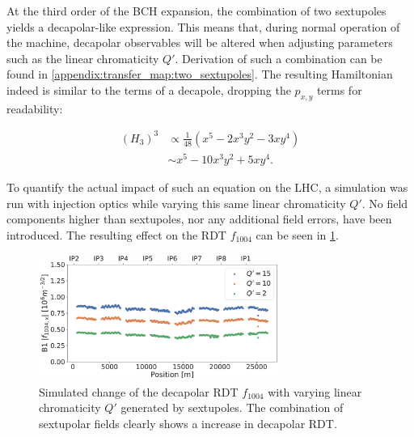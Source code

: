\subsubsection{}

At the third order of the BCH expansion, the combination of two sextupoles yields a decapolar-like
expression. This means that, during normal operation of the machine, decapolar observables will be
altered when adjusting parameters such as the linear chromaticity $Q'$. 
Derivation of such a combination can be found in \cref{appendix:transfer_map:two_sextupoles}. The
resulting Hamiltonian indeed is similar to the terms of a decapole, dropping the $p_{x,y}$ terms for
readability:

\begin{equation}
    \begin{aligned}
         (H_3)^3 &\propto \frac{1}{48} \left(x^5 - 2x^3y^2 - 3xy^4 \right)\\
                 &\sim    x^5 - 10x^3y^2 + 5xy^4.
    \end{aligned}
    \label{eq:decapoles:sextupoles_b5}
\end{equation}

To quantify the actual impact of such an equation on the LHC, a simulation was run with injection
optics while varying this same linear chromaticity $Q'$. No field components higher than
sextupoles, nor any additional field errors, have been introduced. The resulting effect on the RDT
$f_{1004}$ can be seen in \cref{fig:decapoles:rdts:simulated_f1004_from_sextupoles}.


\begin{figure}[H]
    \centering
    \includegraphics[width=0.7\textwidth]{./images/f1004/f1004_dq.pdf}
    \caption{Simulated change of the decapolar RDT $f_{1004}$ with varying linear
    chromaticity $Q'$ generated by sextupoles. The combination of sextupolar fields clearly shows a 
    increase in decapolar RDT.}
    \label{fig:decapoles:rdts:simulated_f1004_from_sextupoles}
\end{figure}

